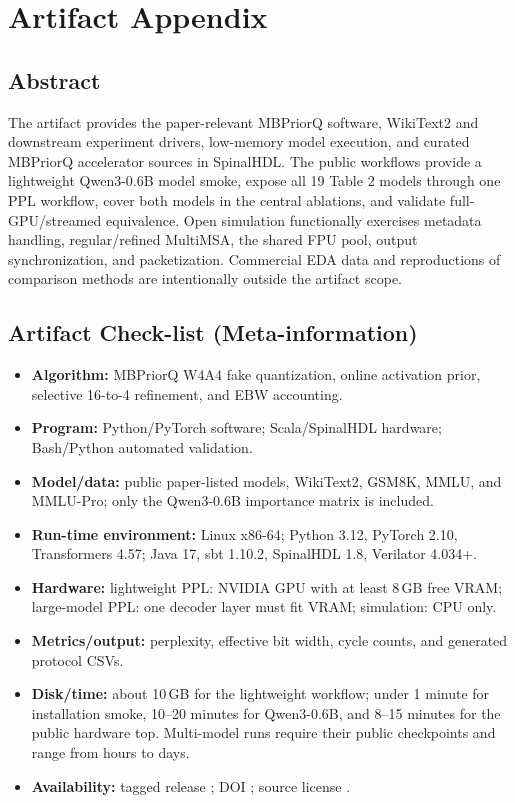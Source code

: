 \appendix
\section{Artifact Appendix}

\subsection{Abstract}
The artifact provides the paper-relevant MBPriorQ software, WikiText2 and
downstream experiment drivers, low-memory model execution, and curated MBPriorQ
accelerator sources in SpinalHDL. The public workflows provide a lightweight
Qwen3-0.6B model smoke, expose all 19 Table 2 models through one PPL workflow,
cover both models in the central ablations, and validate full-GPU/streamed
equivalence.
Open simulation functionally exercises metadata handling, regular/refined
MultiMSA, the shared FPU pool, output synchronization, and packetization.
Commercial EDA data and reproductions of comparison methods are intentionally
outside the artifact scope.

\subsection{Artifact Check-list (Meta-information)}
{\small
\begin{itemize}\setlength\itemsep{0pt}\setlength\parskip{0pt}
  \item \textbf{Algorithm:} MBPriorQ W4A4 fake quantization, online activation
    prior, selective 16-to-4 refinement, and EBW accounting.
  \item \textbf{Program:} Python/PyTorch software; Scala/SpinalHDL hardware;
    Bash/Python automated validation.
  \item \textbf{Model/data:} public paper-listed models, WikiText2, GSM8K,
    MMLU, and MMLU-Pro; only the Qwen3-0.6B importance matrix is included.
  \item \textbf{Run-time environment:} Linux x86-64; Python 3.12, PyTorch 2.10,
    Transformers 4.57; Java 17, sbt 1.10.2, SpinalHDL 1.8, Verilator 4.034+.
  \item \textbf{Hardware:} lightweight PPL: NVIDIA GPU with at least 8\,GB free VRAM;
    large-model PPL: one decoder layer must fit VRAM; simulation: CPU only.
  \item \textbf{Metrics/output:} perplexity, effective bit width, cycle counts,
    and generated protocol CSVs.
  \item \textbf{Disk/time:} about 10\,GB for the lightweight workflow; under 1
    minute for installation smoke, 10--20 minutes for Qwen3-0.6B, and 8--15 minutes for the
    public hardware top. Multi-model runs require their public checkpoints and
    range from hours to days.
  \item \textbf{Availability:} tagged release \ArtifactVersion; DOI
    \ArtifactDOI; source license \ArtifactLicense.
\end{itemize}
}

